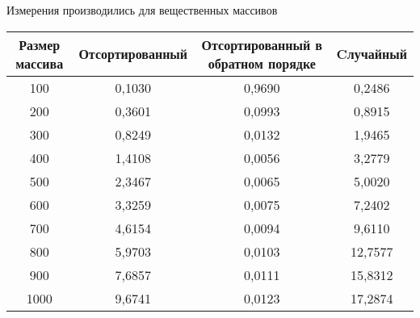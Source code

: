 

\newpage
{}

\flushleft
Измерения производились для вещественных массивов

\begin{center}
	\begin{tabular}{|c|c|c|c|}
		\hline
		Размер массива & Отсортированный & Отсортированный в обратном порядке & Cлучайный\\
		
		\hline
		100 &0,1030 & 0,9690 & 0,2486 \\	
		
		\hline
		200 & 0,3601 & 0,0993 & 0,8915 \\	
		
		\hline
		300 & 0,8249 & 0,0132 & 1,9465 \\	
		
		\hline
		400 & 1,4108 & 0,0056 & 3,2779 \\	
		
		\hline
		500 & 2,3467 & 0,0065 & 5,0020 \\	
		
		\hline 
		600 & 3,3259 & 0,0075 & 7,2402 \\	
		
		\hline
		700 & 4,6154 & 0,0094 & 9,6110 \\	
		
		\hline
		800 & 5,9703 & 0,0103 & 12,7577 \\	
		
		\hline
		900 & 7,6857 & 0,0111 & 15,8312 \\	
		
		\hline
		1000 & 9,6741 & 0,0123 & 17,2874\\	
		
		\hline
		
	\end{tabular}
\end{center}	

